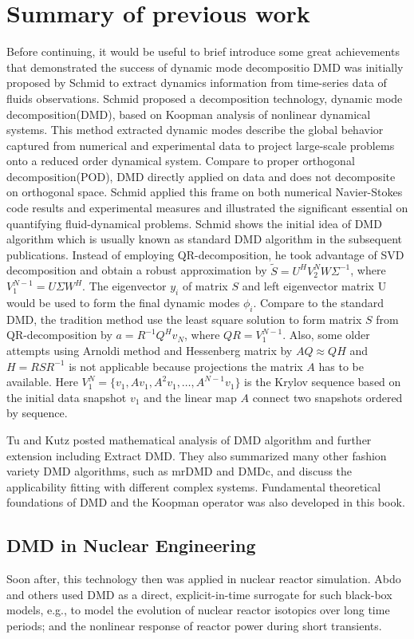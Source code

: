 \section{Summary of previous work}
Before continuing, it would be useful to brief introduce some great achievements that demonstrated the success of dynamic mode decompositio
DMD was initially proposed by Schmid to extract dynamics information from time-series data of fluids observations.\cite{schmid_dynamic_2010}\cite{schmid_applications_2011}
Schmid proposed a decomposition technology, dynamic mode decomposition(DMD), based on Koopman analysis of nonlinear dynamical systems. 
This method extracted dynamic modes describe the global behavior captured from numerical and experimental data to project large-scale problems onto a reduced order dynamical system. 
Compare to proper orthogonal decomposition(POD), DMD directly applied on data and does not decomposite on orthogonal space. 
Schmid applied this frame on both numerical Navier-Stokes code results and experimental measures and illustrated the significant essential on quantifying fluid-dynamical problems.
Schmid shows the initial idea of DMD algorithm which is usually known as standard DMD algorithm in the subsequent publications. 
Instead of employing QR-decomposition, he took advantage of SVD decomposition and obtain a robust approximation by $\tilde{S} = U^HV_2^NW\Sigma^{-1}$, where $V^{N-1}_1 = U\Sigma W^H$. 
The eigenvector $y_i$ of matrix $S$ and left eigenvector matrix U would be used to form the final dynamic modes $\phi_i$. Compare to the standard DMD, the tradition method use the least square solution to form matrix $S$ from QR-decomposition by $a = R^{−1}Q^Hv_N$, where $QR = V^{N-1}_1$. 
Also, some older attempts using Arnoldi method and Hessenberg matrix by $AQ \approx QH$ and $H = RSR^{−1}$ is not applicable because projections the matrix $A$ has to be available. 
Here $V^{N}_1 = \{v_1,Av_1,A^2v_1,…,A^{N-1}v_1 \} $ is the Krylov sequence based on the initial data snapshot $v_1$ and the linear map $A$ connect two snapshots ordered by sequence.  

Tu and Kutz posted mathematical analysis of DMD algorithm and further extension including Extract DMD.  \cite{tu_dynamic_2014}
They also summarized many other fashion variety DMD algorithms, such as mrDMD and DMDc, and discuss the applicability fitting with different complex systems.\cite{kutz_dynamic_2016}
Fundamental theoretical foundations of DMD and the Koopman operator was also developed in this book.

\subsection{DMD in Nuclear Engineering}
Soon after, this technology then was applied in nuclear reactor simulation. 
Abdo and others used DMD as a direct, explicit-in-time surrogate for such black-box models, e.g., to model the evolution of nuclear reactor isotopics over long time periods; and the nonlinear response of reactor power during short transients.\cite{abdo_data-driven_2018}\cite{abdo_modeling_2019}\cite{elzohery2018comparison}

